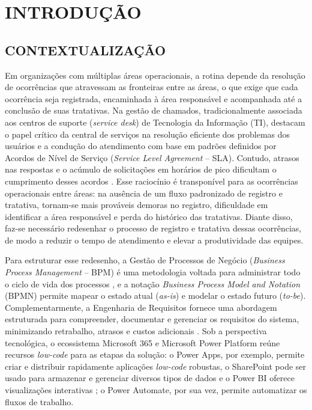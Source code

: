 \section{INTRODUÇÃO}
 
\subsection{CONTEXTUALIZAÇÃO}
 
Em organizações com múltiplas áreas operacionais, a rotina depende da resolução de ocorrências que
  atravessam as fronteiras entre as áreas, o que exige que cada ocorrência seja registrada,
  encaminhada à área responsável e acompanhada até a conclusão de suas tratativas.
Na gestão de chamados, tradicionalmente associada aos centros de suporte (\textit{service desk}) de
  Tecnologia da Informação (TI), \textcite{nainggolan2025} destacam o papel crítico da central de
  serviços na resolução eficiente dos problemas dos usuários e a condução do atendimento com base em
  padrões definidos por Acordos de Nível de Serviço (\textit{Service Level Agreement} -- SLA).
Contudo, atrasos nas respostas e o acúmulo de solicitações em horários de pico dificultam o
  cumprimento desses acordos \cite{nainggolan2025}.
Esse raciocínio é transponível para as ocorrências operacionais entre áreas:
na ausência de um fluxo padronizado de registro e tratativa, tornam-se mais prováveis demoras no
  registro, dificuldade em identificar a área responsável e perda do histórico das tratativas.
Diante disso, faz-se necessário redesenhar o processo de registro e tratativa dessas ocorrências, de
  modo a reduzir o tempo de atendimento e elevar a produtividade das equipes.
 
Para estruturar esse redesenho, a Gestão de Processos de Negócio (\textit{Business Process
  Management} -- BPM) é uma metodologia voltada para administrar todo o ciclo de vida dos processos
  \cite{mpm2022}, e a notação \textit{Business Process Model and Notation} (BPMN) permite mapear o
  estado atual (\textit{as-is}) e modelar o estado futuro (\textit{to-be}).
Complementarmente, a Engenharia de Requisitos fornece uma abordagem estruturada para compreender,
  documentar e gerenciar os requisitos do sistema, minimizando retrabalho, atrasos e custos
  adicionais \cite{costa2023}.
Sob a perspectiva tecnológica, o ecossistema Microsoft 365 e Microsoft Power Platform reúne recursos
  \textit{low-code} para as etapas da solução:
o Power Apps, por exemplo, permite criar e distribuir rapidamente aplicações \textit{low-code}
  robustas, o SharePoint pode ser usado para armazenar e gerenciar diversos tipos de dados e o Power
  BI oferece visualizações interativas \cite{chaudhary2023};
o Power Automate, por sua vez, permite automatizar os fluxos de trabalho.
 
